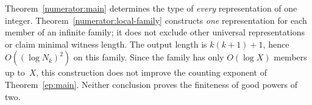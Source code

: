 \begin{remark}
Theorem~\ref{numerator:main} determines the type of \emph{every}
representation of one integer. Theorem~\ref{numerator:local-family}
constructs \emph{one} representation for each member of an infinite
family; it does not exclude other universal representations or claim
minimal witness length. The output length is $k(k+1)+1$, hence
$O((\log N_k)^2)$ on this family. Since the family has only
$O(\log X)$ members up to~$X$, this construction does not improve
the counting exponent of Theorem~\ref{ep:main}. Neither conclusion
proves the finiteness of good powers of two.
\end{remark}
